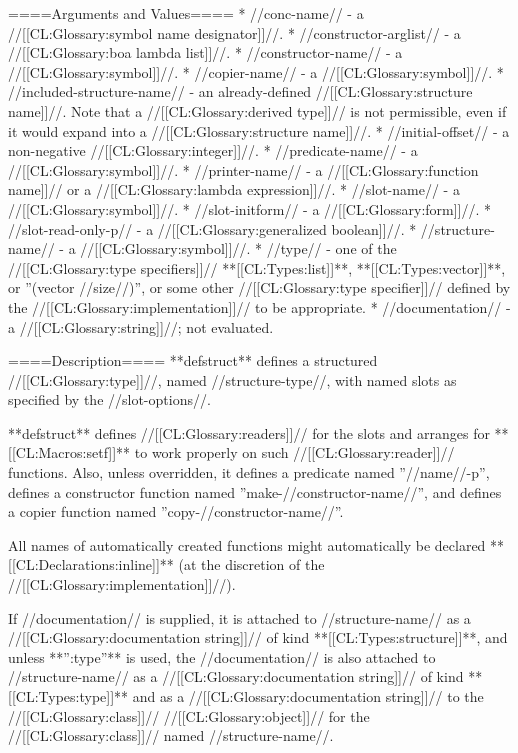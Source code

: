 ====Arguments and Values====
  * //conc-name// - a //[[CL:Glossary:symbol name designator]]//.
  * //constructor-arglist// - a //[[CL:Glossary:boa lambda list]]//.
  * //constructor-name// - a //[[CL:Glossary:symbol]]//.
  * //copier-name// - a //[[CL:Glossary:symbol]]//.
  * //included-structure-name// - an already-defined //[[CL:Glossary:structure name]]//. Note that a //[[CL:Glossary:derived type]]// is not permissible, even if it would expand into a //[[CL:Glossary:structure name]]//.
  * //initial-offset// - a non-negative //[[CL:Glossary:integer]]//.
  * //predicate-name// - a //[[CL:Glossary:symbol]]//.
  * //printer-name// - a //[[CL:Glossary:function name]]// or a //[[CL:Glossary:lambda expression]]//.
  * //slot-name// - a //[[CL:Glossary:symbol]]//.
  * //slot-initform// - a //[[CL:Glossary:form]]//.
  * //slot-read-only-p// - a //[[CL:Glossary:generalized boolean]]//.
  * //structure-name// - a //[[CL:Glossary:symbol]]//.
  * //type// - one of the //[[CL:Glossary:type specifiers]]// **[[CL:Types:list]]**, **[[CL:Types:vector]]**, or ''(vector //size//)'', or some other //[[CL:Glossary:type specifier]]// defined by the //[[CL:Glossary:implementation]]// to be appropriate.
  * //documentation// - a //[[CL:Glossary:string]]//; not evaluated.

====Description====
**defstruct** defines a structured //[[CL:Glossary:type]]//, named //structure-type//, with named slots as specified by the //slot-options//.

**defstruct** defines //[[CL:Glossary:readers]]// for the slots and arranges for **[[CL:Macros:setf]]** to work properly on such //[[CL:Glossary:reader]]// functions. Also, unless overridden, it defines a predicate named ''//name//-p'', defines a constructor function named ''make-//constructor-name//'', and defines a copier function named ''copy-//constructor-name//''.

All names of automatically created functions might automatically be declared **[[CL:Declarations:inline]]** (at the discretion of the //[[CL:Glossary:implementation]]//).

If //documentation// is supplied, it is attached to //structure-name// as a //[[CL:Glossary:documentation string]]// of kind **[[CL:Types:structure]]**, and unless **'':type''** is used, the //documentation// is also attached to //structure-name// as a //[[CL:Glossary:documentation string]]// of kind **[[CL:Types:type]]** and as a //[[CL:Glossary:documentation string]]// to the //[[CL:Glossary:class]]// //[[CL:Glossary:object]]// for the //[[CL:Glossary:class]]// named //structure-name//.

